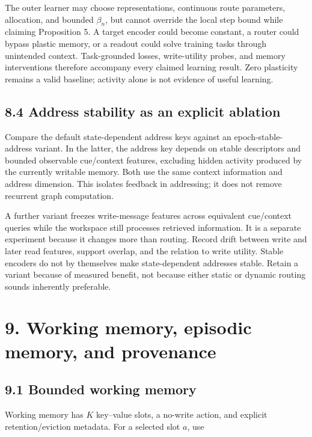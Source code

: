 \documentclass[
  11pt,
  a4paper,
]{article}
\begin{document}
The outer learner may choose representations, continuous route
parameters, allocation, and bounded \(\beta_n\), but cannot override the
local step bound while claiming Proposition 5. A target encoder could
become constant, a router could bypass plastic memory, or a readout
could solve training tasks through unintended context. Task-grounded
losses, write-utility probes, and memory interventions therefore
accompany every claimed learning result. Zero plasticity remains a valid
baseline; activity alone is not evidence of useful learning.

\subsection{8.4 Address stability as an explicit
ablation}\label{address-stability-as-an-explicit-ablation}

Compare the default state-dependent address keys against an
epoch-stable-address variant. In the latter, the address key depends on
stable descriptors and bounded observable cue/context features,
excluding hidden activity produced by the currently writable memory.
Both use the same context information and address dimension. This
isolates feedback in addressing; it does not remove recurrent graph
computation.

A further variant freezes write-message features across equivalent
cue/context queries while the workspace still processes retrieved
information. It is a separate experiment because it changes more than
routing. Record drift between write and later read features, support
overlap, and the relation to write utility. Stable encoders do not by
themselves make state-dependent addresses stable. Retain a variant
because of measured benefit, not because either static or dynamic
routing sounds inherently preferable.

\section{9. Working memory, episodic memory, and
provenance}\label{working-memory-episodic-memory-and-provenance}

\subsection{9.1 Bounded working memory}\label{bounded-working-memory}

Working memory has \(K\) key--value slots, a no-write action, and
explicit retention/eviction metadata. For a selected slot \(a\), use
\end{document}
